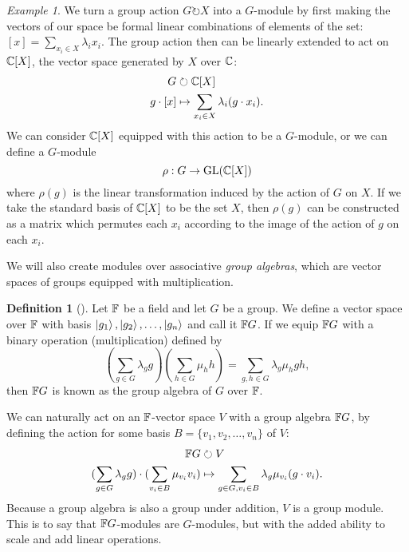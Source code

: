 \documentclass[12pt,twoside]{reedthesis}
\theoremstyle{plain}   %
\theoremstyle{definition}
\newtheorem{defn}{Definition}[section]
\theoremstyle{remark}
\newtheorem{ex}{Example}[section]
\numberwithin{equation}{section}
\def\GL{\mathrm{GL}} \def\SL{\mathrm{SL}}  \def\SP{\mathrm{SL}}\def\OG{\mathrm{O}}
\def\acts{\circlearrowright} %
\begin{document}
  \begin{ex} We turn a group action $G \acts X$ into a $G$-module by first making the vectors of our space be
    formal linear combinations of elements of the set: $[x] = \sum_{x_i \in X} \lambda_i x_i$.
    The group action then can be linearly extended to act on $\mathbb{C}[X]$, the vector space generated by $X$ over $\mathbb{C}$:
    \begin{align*}
      G &\acts \CC [X] \\
      g \cdot [x] &\mapsto \sum_{x_i \in X} \lambda_i (g \cdot x_i).
    \end{align*}
    We can consider $\mathbb{C} [X]$ equipped with this action to be a $G$-module, or we can define a $G$-module
    \[ \rho: G \to \GL(\CC [X])\]
    where $\rho(g)$ is the linear transformation induced by the action of $G$ on $X$. If we take the standard basis of $\mathbb{C} [X]$ to be
    the set $X$, then $\rho(g)$ can be constructed as a matrix which permutes each $x_i$ according to the image of the action of $g$ on each $x_i$.
  \end{ex}
  We will also create modules over associative \emph{group algebras}, which are vector spaces of groups equipped with multiplication.
  \begin{defn}[{\cite{james2001}}]
    Let $\mathbb{F}$ be a field and let $G$ be a group. We define a vector space over $\mathbb{F}$ with basis $\ket{g_1}, \ket{g_2}, \dots, \ket{g_n}$ and call it $\mathbb{F} G$.
    If we equip $\mathbb{F} G$ with a binary operation (multiplication) defined by
    \[\left( \sum_{g \in G} \lambda_g g \right) \left( \sum_{h \in G} \mu_h h \right) = \sum_{g,h \in G} \lambda_g \mu_h gh,\]
    then $\mathbb{F} G$ is known as the group algebra of $G$ over $\mathbb{F}$.
  \end{defn}
  We can naturally act on an $\mathbb{F}$-vector space $V$ with a group algebra $\mathbb{F} G$, by defining the action for some basis $B = \{v_1, v_2, \dots, v_n \}$ of $V$:
  \begin{align*}
    \FF G &\acts V \\
    (\sum_{g \in G} \lambda_g g) \cdot (\sum_{v_i \in B} \mu_{v_i} v_i) &\mapsto \sum_{g \in G, v_i \in B} \lambda_g \mu_{v_i}  (g \cdot v_i).
  \end{align*}
  Because a group algebra is also a group under addition, $V$ is a group module.
  This is to say that $\mathbb{F} G$-modules are $G$-modules, but with the added ability to scale and add linear operations.
  
\end{document}

